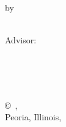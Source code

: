 \pagestyle{empty}

\begin{titlepage}
        \begin{center}
        \vspace*{1.0cm}

        \Huge
        {\bf \thesistitlecoverpage }

        \vspace*{1.0cm}

        \normalsize
        by \\

        \vspace*{1.0cm}

        \Large
        \thesisauthor\\
        Advisor:~\advisor\\

        \vspace*{3.0cm}


        \vspace*{2.0cm}

        \nameofprogram\\
        \academicunit\\
        \nameOfUniversity\\

        \vspace*{4.0cm}

        \copyright~\thesisauthor,\\Peoria, Illinois, \graduationyear\\
        \end{center}
\end{titlepage}


\pagestyle{plain}
\setcounter{page}{2}

\cleardoublepage %



